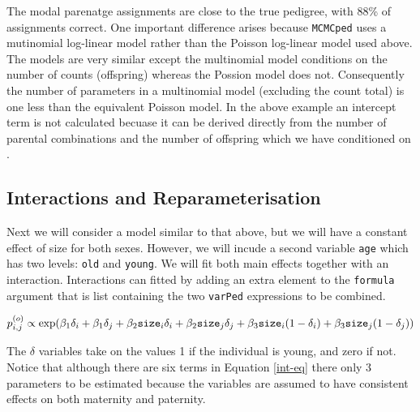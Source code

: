 \documentclass{article}
\begin{document}
The modal parenatge assignments are close to the true pedigree, with 88\% of assignments correct. One important difference arises because \texttt{MCMCped} uses a mutinomial log-linear model rather than the Poisson log-linear model used above.  The models are very similar except the multinomial model conditions on the number of counts (offspring) whereas the Possion model does not. Consequently the number of parameters in a multinomial model (excluding the count total) is one less than the equivalent Poisson model. In the above example an intercept term is not calculated becuase it can be derived directly from the number of parental combinations and the number of offspring which we have conditioned on \citep{McCullagh.1989}.  

\subsection{Interactions and Reparameterisation}

Next we will consider a model similar to that above, but we will have a constant effect of size for both sexes.  However, we will incude a second variable \texttt{age} which has two levels: \texttt{old} and \texttt{young}. We will fit both main effects together with an interaction.  Interactions can fitted by adding an extra element to the \texttt{formula} argument that is list containing the two \texttt{varPed} expressions to be combined.

\begin{equation}
p^{(o)}_{i,j} \propto \textrm{exp}(\beta_{1}\delta_{i}+\beta_{1}\delta_{j}+\beta_{2}\textrm{\texttt{size}}_{i}\delta_{i}+\beta_{2}\textrm{\texttt{size}}_{j}\delta_{j}+\beta_{3}\textrm{\texttt{size}}_{i}(1-\delta_{i})+\beta_{3}\textrm{\texttt{size}}_{j}(1-\delta_{j}))
\label{int-eq}
\end{equation}

The $\delta$ variables take on the values 1 if the individual is young, and zero if not.  Notice that although there are six terms in Equation \ref{int-eq} there only 3 parameters to be estimated because the variables are assumed to have consistent effects on both maternity and paternity.   


\begin{Schunk}
\end{Schunk}
\end{document}

